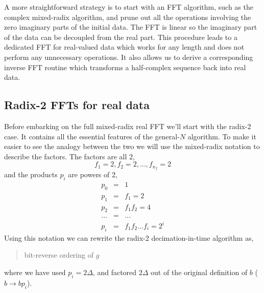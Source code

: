 \documentclass[fleqn,12pt]{article}
\newenvironment{algorithm}{\begin{quote} %
\begin{algorithmic}\samepage}{\end{algorithmic} %
\end{quote}}
\begin{document}
A more straightforward strategy is to start with an FFT algorithm,
such as the complex mixed-radix algorithm, and prune out all the
operations involving the zero imaginary parts of the initial data. The
FFT is linear so the imaginary part of the data can be decoupled from
the real part. This procedure leads to a dedicated FFT for real-valued
data which works for any length and does not perform any unnecessary
operations. It also allows us to derive a corresponding inverse FFT
routine which transforms a half-complex sequence back into real data.

\subsection{Radix-2 FFTs for real data}
%
Before embarking on the full mixed-radix real FFT we'll start with the
radix-2 case. It contains all the essential features of the
general-$N$ algorithm. To make it easier to see the analogy between
the two we will use the mixed-radix notation to describe the
factors. The factors are all 2,
%
\begin{equation}
f_1 = 2, f_2 = 2, \dots, f_{n_f} = 2
\end{equation}
%
and the products $p_i$ are powers of 2,
%
\begin{eqnarray}
p_0 & = & 1 \\
p_1 & = & f_1 = 2 \\
p_2 & = & f_1 f_2 = 4 \\
\dots &=& \dots \\
p_i & = & f_1 f_2 \dots f_i = 2^i 
\end{eqnarray}
%
Using this notation we can rewrite the radix-2 decimation-in-time
algorithm as,
%
\begin{algorithm}
\STATE bit-reverse ordering of $g$
     \ENDFOR
  \ENDFOR
\ENDFOR
\end{algorithm}
%
where we have used $p_i = 2 \Delta$, and factored $2 \Delta$ out of
the original definition of $b$ ($b \to b p_i$).
\end{document}
